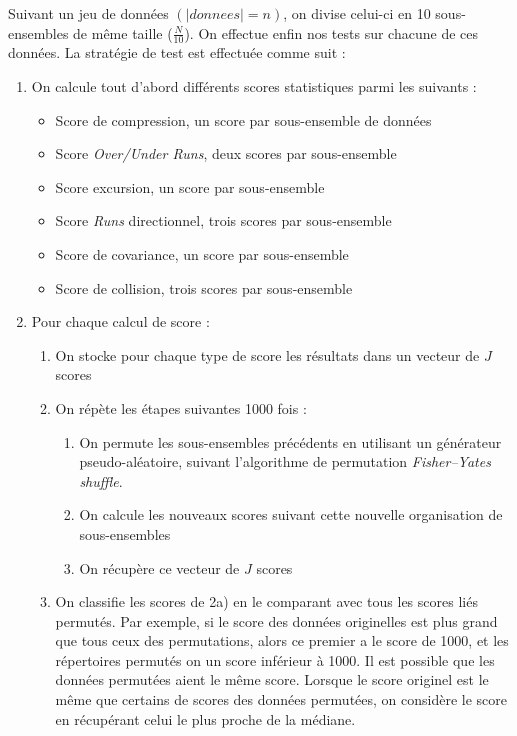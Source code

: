 Suivant un jeu de données $(|donnees|=n)$, on divise celui-ci en 10 sous-ensembles de même taille ($\frac{N}{10}$). On effectue enfin nos tests sur chacune de ces données. La stratégie de test est effectuée comme suit : 
\begin{enumerate}
\item On calcule tout d'abord différents scores statistiques parmi les suivants :
	\begin{itemize}
	\item Score de compression, un score par sous-ensemble de données
	\item Score \textit{Over/Under Runs}, deux scores par sous-ensemble
	\item Score excursion, un score par sous-ensemble
	\item Score \textit{Runs} directionnel, trois scores par sous-ensemble
	\item Score de covariance, un score par sous-ensemble 
	\item Score de collision, trois scores par sous-ensemble\\
	\end{itemize}
	
\item Pour chaque calcul de score : 
	\begin{enumerate}
	\item On stocke pour chaque type de score les résultats dans un vecteur de $J$ scores
	\item On répète les étapes suivantes 1000 fois :
		\begin{enumerate}
		\item On permute les sous-ensembles précédents en utilisant un générateur pseudo-aléatoire, suivant l'algorithme de permutation \textit{Fisher–Yates shuffle}. 
		\item On calcule les nouveaux scores suivant cette nouvelle organisation de sous-ensembles
		\item On récupère ce vecteur de $J$ scores
		\end{enumerate}
	\item On classifie les scores de 2a) en le comparant avec tous les scores liés permutés. Par exemple, si le score des données originelles est plus grand que tous ceux des permutations, alors ce premier a le score de 1000, et les répertoires permutés on un score inférieur à 1000. Il est possible que les données permutées aient le même score. Lorsque le score originel est le même que certains de scores des données permutées, on considère le score en récupérant celui le plus proche de la médiane. \\
	

\end{enumerate}
\end{enumerate}
